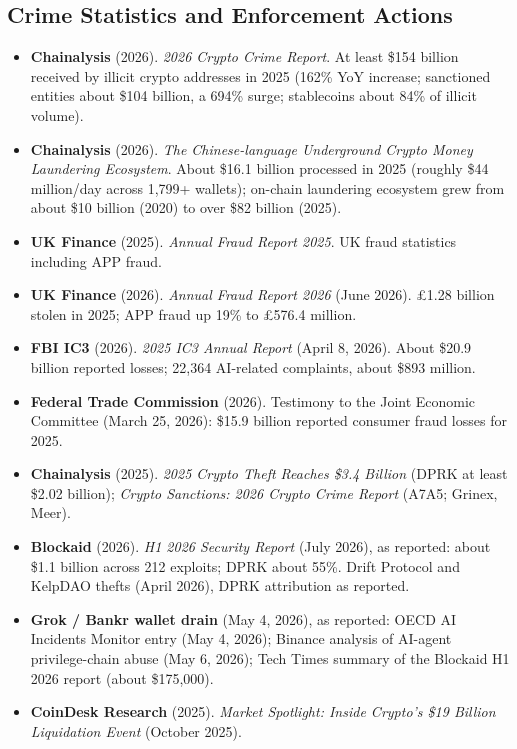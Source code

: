 \documentclass[11pt,letterpaper]{article}
\begin{document}
\subsection*{Crime Statistics and Enforcement Actions}

\begin{itemize}[leftmargin=1.5em]
  \item \textbf{Chainalysis} (2026). \textit{2026 Crypto Crime Report}. At least \$154 billion received by illicit crypto addresses in 2025 (162\% YoY increase; sanctioned entities about \$104 billion, a 694\% surge; stablecoins about 84\% of illicit volume).
  \item \textbf{Chainalysis} (2026). \textit{The Chinese-language Underground Crypto Money Laundering Ecosystem}. About \$16.1 billion processed in 2025 (roughly \$44 million/day across 1,799+ wallets); on-chain laundering ecosystem grew from about \$10 billion (2020) to over \$82 billion (2025).
  \item \textbf{UK Finance} (2025). \textit{Annual Fraud Report 2025}. UK fraud statistics including APP fraud.
  \item \textbf{UK Finance} (2026). \textit{Annual Fraud Report 2026} (June 2026). \pounds1.28 billion stolen in 2025; APP fraud up 19\% to \pounds576.4 million.
  \item \textbf{FBI IC3} (2026). \textit{2025 IC3 Annual Report} (April 8, 2026). About \$20.9 billion reported losses; 22,364 AI-related complaints, about \$893 million.
  \item \textbf{Federal Trade Commission} (2026). Testimony to the Joint Economic Committee (March 25, 2026): \$15.9 billion reported consumer fraud losses for 2025.
  \item \textbf{Chainalysis} (2025). \textit{2025 Crypto Theft Reaches \$3.4 Billion} (DPRK at least \$2.02 billion); \textit{Crypto Sanctions: 2026 Crypto Crime Report} (A7A5; Grinex, Meer).
  \item \textbf{Blockaid} (2026). \textit{H1 2026 Security Report} (July 2026), as reported: about \$1.1 billion across 212 exploits; DPRK about 55\%. Drift Protocol and KelpDAO thefts (April 2026), DPRK attribution as reported.
  \item \textbf{Grok / Bankr wallet drain} (May 4, 2026), as reported: OECD AI Incidents Monitor entry (May 4, 2026); Binance analysis of AI-agent privilege-chain abuse (May 6, 2026); Tech Times summary of the Blockaid H1 2026 report (about \$175,000).
  \item \textbf{CoinDesk Research} (2025). \textit{Market Spotlight: Inside Crypto's \$19 Billion Liquidation Event} (October 2025).

\end{itemize}
\end{document}
